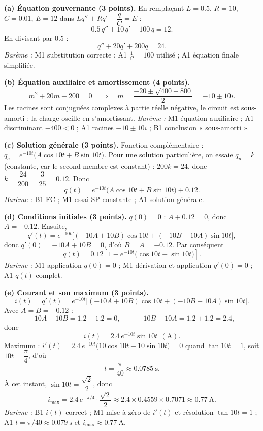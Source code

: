 \documentclass[11pt]{article}
\newcommand{\cle}[1]{{\popxbold\color{popdark}#1}}
\begin{document}
\begin{corrige}
\textbf{(a) Équation gouvernante (3 points).} En remplaçant $L = 0.5$, $R = 10$, $C = 0.01$, $E = 12$ dans $Lq'' + Rq' + \dfrac{q}{C} = E$ :
\[ 0.5\,q'' + 10\,q' + 100\,q = 12. \]
En divisant par $0.5$ :
\[ q'' + 20q' + 200q = 24. \]
\emph{Barème :} M1 substitution correcte ; A1 $\frac{1}{C} = 100$ utilisé ; A1 équation finale simplifiée.

\textbf{(b) Équation auxiliaire et amortissement (4 points).}
\[ m^{2} + 20m + 200 = 0 \quad\Longrightarrow\quad m = \frac{-20 \pm \sqrt{400 - 800}}{2} = -10 \pm 10i. \]
Les racines sont conjuguées complexes à partie réelle négative, le circuit est \cle{sous-amorti} : la charge oscille en s'amortissant. \emph{Barème :} M1 équation auxiliaire ; A1 discriminant $-400 < 0$ ; A1 racines $-10 \pm 10i$ ; B1 conclusion « sous-amorti ».

\textbf{(c) Solution générale (3 points).} Fonction complémentaire : $q_{c} = e^{-10t}\big(A\cos 10t + B\sin 10t\big)$. Pour une solution particulière, on essaie $q_{p} = k$ (constante, car le second membre est constant) : $200k = 24$, donc $k = \dfrac{24}{200} = \dfrac{3}{25} = 0.12$. Donc
\[ \boxed{q(t) = e^{-10t}\big(A\cos 10t + B\sin 10t\big) + 0.12}. \]
\emph{Barème :} B1 FC ; M1 essai SP constante ; A1 solution générale.

\textbf{(d) Conditions initiales (3 points).} $q(0) = 0$ : $A + 0.12 = 0$, donc $A = -0.12$. Ensuite,
\[ q'(t) = e^{-10t}\big[(-10A + 10B)\cos 10t + (-10B - 10A)\sin 10t\big], \]
donc $q'(0) = -10A + 10B = 0$, d'où $B = A = -0.12$. Par conséquent
\[ \boxed{q(t) = 0.12\left[1 - e^{-10t}\big(\cos 10t + \sin 10t\big)\right]}. \]
\emph{Barème :} M1 application $q(0)=0$ ; M1 dérivation et application $q'(0)=0$ ; A1 $q(t)$ complet.

\textbf{(e) Courant et son maximum (3 points).}
\[ i(t) = q'(t) = e^{-10t}\big[(-10A+10B)\cos 10t + (-10B-10A)\sin 10t\big]. \]
Avec $A = B = -0.12$ :
\[ -10A+10B = 1.2 - 1.2 = 0, \qquad -10B-10A = 1.2 + 1.2 = 2.4, \]
donc
\[ \boxed{i(t) = 2.4\,e^{-10t}\sin 10t \ \ (\mathrm{A})}. \]
Maximum : $i'(t) = 2.4\,e^{-10t}\big(10\cos 10t - 10\sin 10t\big) = 0$ quand $\tan 10t = 1$, soit $10t = \dfrac{\pi}{4}$, d'où
\[ t = \frac{\pi}{40} \approx 0.0785\ \mathrm{s}. \]
À cet instant, $\sin 10t = \dfrac{\sqrt{2}}{2}$, donc
\[ i_{\max} = 2.4\,e^{-\pi/4}\cdot\frac{\sqrt{2}}{2} \approx 2.4 \times 0.4559 \times 0.7071 \approx 0.77\ \mathrm{A}. \]
\emph{Barème :} B1 $i(t)$ correct ; M1 mise à zéro de $i'(t)$ et résolution $\tan 10t = 1$ ; A1 $t = \pi/40 \approx 0.079\ \mathrm{s}$ et $i_{\max} \approx 0.77\ \mathrm{A}$.
\end{corrige}
\end{document}
